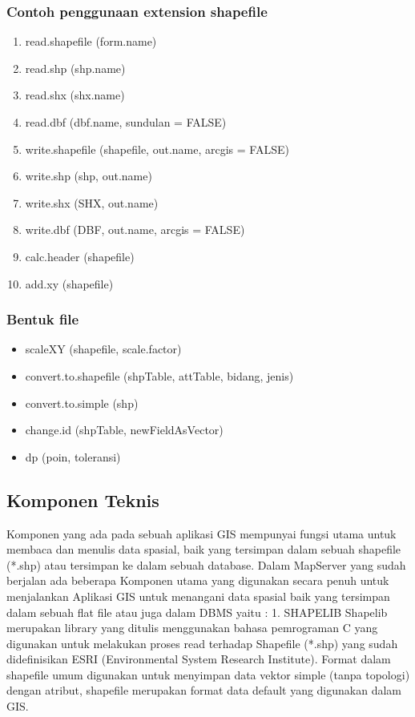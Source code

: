 \subsubsection{Contoh penggunaan extension shapefile}
\begin{enumerate}
    \item read.shapefile (form.name) 
    \item read.shp (shp.name) 
    \item read.shx (shx.name)
    \item read.dbf (dbf.name, sundulan = FALSE)
    \item write.shapefile (shapefile, out.name, arcgis = FALSE) 
    \item write.shp (shp, out.name) 
    \item write.shx (SHX, out.name)
    \item write.dbf (DBF, out.name, arcgis = FALSE) 
    \item calc.header (shapefile) 
    \item add.xy (shapefile)
\end{enumerate}
\subsubsection{Bentuk file}
\begin{itemize}
    \item scaleXY (shapefile, scale.factor)
    \item convert.to.shapefile (shpTable, attTable, bidang, jenis) 
    \item convert.to.simple (shp)
    \item change.id (shpTable, newFieldAsVector) 
    \item dp (poin, toleransi)
\end{itemize}


\subsection{Komponen Teknis}
Komponen yang ada pada sebuah aplikasi GIS
mempunyai fungsi utama untuk membaca dan menulis
data spasial, baik yang tersimpan dalam sebuah
shapefile (*.shp) atau tersimpan ke dalam sebuah
database.
Dalam MapServer yang sudah berjalan ada beberapa
Komponen utama yang digunakan secara penuh untuk
menjalankan Aplikasi GIS untuk menangani data
spasial baik yang tersimpan dalam sebuah flat file atau
juga dalam DBMS yaitu :
1. SHAPELIB
Shapelib merupakan library yang ditulis
menggunakan bahasa pemrograman C yang
digunakan untuk melakukan proses read terhadap
Shapefile (*.shp) yang sudah didefinisikan ESRI
(Environmental System Research Institute).
Format dalam shapefile umum digunakan untuk
menyimpan data vektor simple (tanpa topologi)
dengan atribut, shapefile merupakan format data
default yang digunakan dalam GIS.

